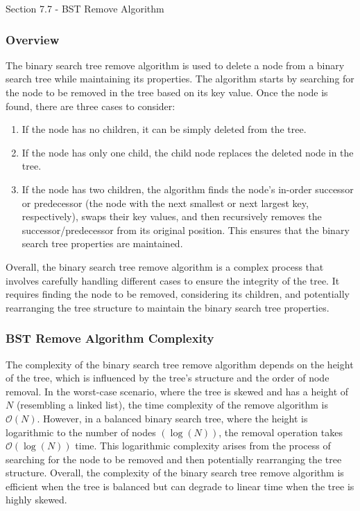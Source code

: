 \begin{notes}{Section 7.7 - BST Remove Algorithm}
    \subsubsection*{Overview}

    The binary search tree remove algorithm is used to delete a node from a binary search tree while maintaining its properties. The algorithm starts by searching for the node to be removed in the tree based on its key value. Once the node is found, there are three cases to consider:
    \begin{enumerate}
        \item If the node has no children, it can be simply deleted from the tree.
        \item If the node has only one child, the child node replaces the deleted node in the tree.
        \item If the node has two children, the algorithm finds the node's in-order successor or predecessor (the node with the next smallest or next largest key, respectively), swaps their key values, and then recursively removes the successor/predecessor from its original position. This ensures that the binary search tree properties are maintained.
    \end{enumerate}
    Overall, the binary search tree remove algorithm is a complex process that involves carefully handling different cases to ensure the integrity of the tree. It requires finding the node to be removed, considering its children, and potentially rearranging the tree structure to maintain the binary search tree properties.
    
    \subsubsection*{BST Remove Algorithm Complexity}
    
    The complexity of the binary search tree remove algorithm depends on the height of the tree, which is influenced by the tree's structure and the order of node removal. In the worst-case scenario, where the tree is skewed and has a height of $N$ (resembling a linked list), the time complexity of the remove algorithm is $\mathcal{O}(N)$. However, in 
    a balanced binary search tree, where the height is logarithmic to the number of nodes $(\log{(N)})$, the removal operation takes $\mathcal{O}(\log{(N)})$ time. This logarithmic complexity arises from the process of searching for the node to be removed and then potentially rearranging the tree structure. Overall, the complexity of the binary search tree 
    remove algorithm is efficient when the tree is balanced but can degrade to linear time when the tree is highly skewed.
    

\end{notes}
